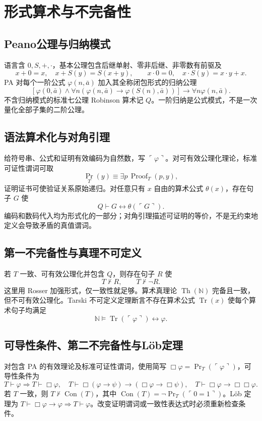 \documentclass[../main.tex]{subfiles}
\begin{document}
\section{形式算术与不完备性}
\subsection{Peano公理与归纳模式}
语言含 $0,S,+,\cdot$，基本公理包含后继单射、零非后继、非零数有前驱及
\[
x+0=x,\quad x+S(y)=S(x+y),\qquad
x\cdot0=0,\quad x\cdot S(y)=x\cdot y+x.
\]
PA 对每个一阶公式 $\varphi(n,\bar a)$ 加入其全称闭包形式的归纳公理
\[
[\varphi(0,\bar a)\land\forall n(\varphi(n,\bar a)\to\varphi(S(n),\bar a))]
\to\forall n\varphi(n,\bar a).
\]
不含归纳模式的标准七公理 Robinson 算术记 $Q$。一阶归纳是公式模式，不是一次量化全部子集的二阶公理。
\subsection{语法算术化与对角引理}
给符号串、公式和证明有效编码为自然数，写 $\ulcorner\varphi\urcorner$。对可有效公理化理论，标准可证性谓词可取
\[
\operatorname{Pr}_T(y)\equiv\exists p\,\operatorname{Proof}_T(p,y),
\]
证明证书可使验证关系原始递归。对任意只有 $x$ 自由的算术公式 $\theta(x)$，存在句子 $G$ 使
\[
Q\vdash G\leftrightarrow\theta(\ulcorner G\urcorner).
\]
编码和数码代入均为形式化的一部分；对角引理描述可证明的等价，不是无约束地定义会导致矛盾的真值谓词。
\subsection{第一不完备性与真理不可定义}
若 $T$ 一致、可有效公理化并包含 $Q$，则存在句子 $R$ 使
\[
T\nvdash R,\qquad T\nvdash\neg R.
\]
这里用 Rosser 加强形式，仅一致性就足够。算术真理论 $\operatorname{Th}(\mathbb N)$ 完备且一致，但不可有效公理化。Tarski 不可定义定理断言不存在算术公式 $\operatorname{Tr}(x)$ 使每个算术句子均满足
\[
\mathbb N\models\operatorname{Tr}(\ulcorner\varphi\urcorner)\leftrightarrow\varphi.
\]
\subsection{可导性条件、第二不完备性与Löb定理}
对包含 PA 的有效理论及标准可证性谓词，使用简写 $\Box\varphi=\operatorname{Pr}_T(\ulcorner\varphi\urcorner)$，可导性条件为
\[
T\vdash\varphi\Rightarrow T\vdash\Box\varphi,\quad
T\vdash\Box(\varphi\to\psi)\to(\Box\varphi\to\Box\psi),\quad
T\vdash\Box\varphi\to\Box\Box\varphi.
\]
若 $T$ 一致，则 $T\nvdash\operatorname{Con}(T)$，其中 $\operatorname{Con}(T)=\neg\operatorname{Pr}_T(\ulcorner0=1\urcorner)$。Löb 定理为 $T\vdash\Box\varphi\to\varphi\Rightarrow T\vdash\varphi$。改变证明谓词或一致性表达式时必须重新检查条件。
\end{document}
